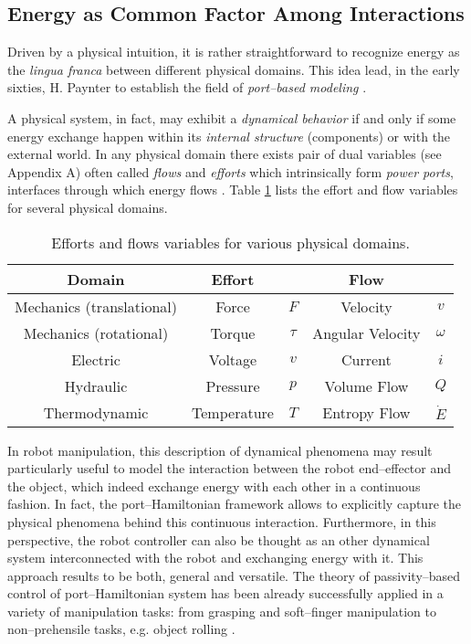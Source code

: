 \subsection{Energy as Common Factor Among Interactions}\label{subsec:comm_fact}
%
Driven by a physical intuition, it is rather straightforward to recognize energy as the \textit{lingua franca} between different physical domains. This idea lead, in the early sixties, H. Paynter to establish the field of \textit{port--based modeling} \citep{paynter1961analysis}.
%
\newline

%
A physical system, in fact, may exhibit a \textit{dynamical behavior} if and only if some energy exchange happen within its \textit{internal structure} (components) or with the external world. In any physical domain there exists pair of dual variables (see Appendix A) often called \textit{flows} and \textit{efforts} which intrinsically form \textit{power ports}, interfaces through which energy flows \citep{secchi2007control}. Table \ref{tab:ef} lists the effort and flow variables for several physical domains.
%
\begin{table}[t]
	\centering
	\caption{Efforts and flows variables for various physical domains.}
	\begin{tabular}{|c|cc|cc|} \hline
			\rowcolor{gray!50}\textbf{Domain}&{\centering \textbf{Effort}}&&{\centering \textbf{Flow}}&\\\hline
			Mechanics (translational)&Force&$F$&Velocity&$v$\\\hline
			\rowcolor{gray!15}Mechanics (rotational)&Torque &$\tau$&Angular Velocity &$\omega$\\\hline
			Electric&Voltage &$v$&Current &$i$\\\hline
			\rowcolor{gray!15}Hydraulic&Pressure& $p$&Volume Flow &$Q$\\\hline
			Thermodynamic&Temperature &$T$&Entropy Flow &$\dot{E}$\\\hline
	\end{tabular}
	\label{tab:ef}
\end{table}
%
\newline

In robot manipulation, this description of dynamical phenomena may result particularly useful to model the interaction between the robot end--effector and the object, which indeed exchange energy with each other in a continuous fashion.
%
In fact, the port--Hamiltonian framework allows to explicitly capture the physical phenomena behind this continuous interaction. Furthermore, in this perspective, the robot controller can also be thought as an other dynamical system interconnected with the robot and exchanging energy with it. 
This approach results to be both, general and versatile.
%
The theory of passivity--based control of port--Hamiltonian system has been already successfully applied in a variety of manipulation tasks: from grasping \citep{stramigioli99} and soft--finger manipulation \citep{ficuciello2010} to non--prehensile tasks, e.g. object rolling \citep{donaire2017,serra2019}.
%
\newline

